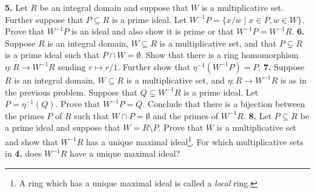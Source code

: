 \documentclass[10pt]{amsart}
\theoremstyle{theorem}
\renewcommand{\to}[1][]{\xrightarrow{\ #1\ }}
\begin{document}
\newpage
\noindent
{\bf 5.}  Let $R$ be an integral domain and suppose that $W$ is a multiplicative set.    Further suppose that $P \subseteq R$ is a prime ideal.  Let $W^{-1}P = \{ x/w \;|\; x \in P, w \in W\}$.  Prove that $W^{-1}P$ is an ideal and also show it is prime or that $W^{-1}P = W^{-1}R$.
\newpage
\noindent
{\bf 6.}  Suppose $R$ is an integral domain, $W \subseteq R$ is a multiplicative set, and that $P \subsetneq R$ is a prime ideal such that $P \cap W = \emptyset$.  Show that there is a ring homomorphism $\eta : R \to W^{-1}R$ sending $r \mapsto r/1$.  Further show that $\eta^{-1} (W^{-1}P) = P$.  
\newpage
\noindent
{\bf 7.}  Suppose $R$ is an integral domain, $W \subseteq R$ is a multiplicative set, and $\eta : R \to W^{-1}R$ is as in the previous problem.  Suppose that $Q \subsetneq W^{-1}R$ is a prime ideal.  Let $P = \eta^{-1}(Q)$.  Prove that $W^{-1}P = Q$.  
\vskip 3pt
Conclude that there is a bijection between the primes $P$ of $R$ such that $W \cap P = \emptyset$ and the primes of $W^{-1}R$.  
\newpage
\noindent
{\bf 8.}  Let $P \subseteq R$ be a prime ideal and suppose that $W = R \setminus P$.  Prove that $W$ is a multiplicative set and show that $W^{-1}R$ has a unique maximal ideal\footnote{A ring which has a unique maximal ideal is called a \emph{local} ring.}.  For which multiplicative sets in {\bf 4.} does $W^{-1}R$ have a unique maximal ideal?
\end{document}
